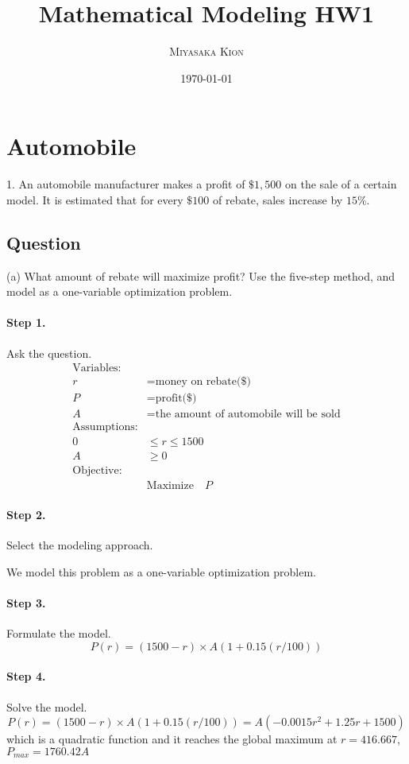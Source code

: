 \documentclass[11pt]{article}
\title{\textbf{Mathematical Modeling HW1}}
\author{\textsc{Miyasaka Kion}}
\date{\today}
\begin{document}
	
\maketitle

\section{Automobile}
1. An automobile manufacturer makes a profit of $\$ 1,500$ on the sale of a certain model. It is estimated that for every $\$ 100$ of rebate, sales increase by $15 \%$.

\subsection{Question}
(a) What amount of rebate will maximize profit? Use the five-step method, and model as a one-variable optimization problem.
\paragraph{Step 1.} Ask the question.
$$
\begin{aligned}
\text{Variables:}\\
  r&= \text{money on rebate(\$)}\\
  P &= \text{profit(\$)}\\
  A& =\text{the amount of automobile will be sold}\\
\text{Assumptions:}\\
 0 &\leq r \leq 1500 \\
 A &\geq 0\\
\text{Objective:}\\
& \text{Maximize} \quad P 
\end{aligned}
$$

\paragraph{Step 2.} Select the modeling approach.

We model this problem as a one-variable optimization problem.
\paragraph{Step 3.} Formulate the model.
$$
P (r)= (1500 - r) \times A(1+ 0.15(r /100))
$$

\paragraph{Step 4.} Solve the model.
$$
P (r)= (1500 - r) \times A(1+ 0.15(r /100)) = A(-0.0015 r^2+1.25 r+1500)
$$
which is a quadratic function and it reaches the global maximum at $r =416.667 $, $P_{max}  = 1760.42A$ 
\end{document}
